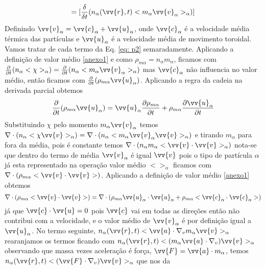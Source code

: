 \documentclass[12pt,oneside,a4paper]{abntex2}
\theoremstyle{definition}  %
\begin{document}
\begin{equation*}
=[\frac{\delta}{\delta t}(n_\alpha(\vv{r},t)<m_\alpha \vv{v}_\alpha>_\alpha)]
\end{equation*}
Definindo $\vv{v}_\alpha = \vv{c}_\alpha + \vv{u}_\alpha$, onde $\vv{c}_\alpha$ é a velocidade média térmica das partículas e  $\vv{u}_\alpha$ é a velocidade média de movimento toroidal. Vamos tratar de cada termo da Eq. \ref{eq: p2} semaradamente.
Aplicando a definição de valor médio \ref{anexo1} e como $ \rho_{m\alpha} = n_\alpha m_\alpha$, ficamos com $\frac{\partial }{\partial t} (n_\alpha <\chi>_\alpha)=\frac{\partial }{\partial t} (n_\alpha <m_\alpha \vv{v}_\alpha>_\alpha)$ mas $\vv{c}_\alpha$ não influencia no valor médio, então ficamos com $\frac{\partial }{\partial t} (\rho_{m\alpha} \vv{u}_\alpha)$. Aplicando a regra da cadeia na derivada parcial obtemos
\begin{equation}
\label{eq: pit14}
\frac{\partial }{\partial t} (\rho_{m\alpha} \vv{u}_\alpha) = \vv{u}_\alpha \frac{\partial \rho_{m\alpha}}{\partial t}+\rho_{m\alpha} \frac{\partial \vv{u}_\alpha}{\partial t}
\end{equation} 
Substituindo $\chi$ pelo momento $m_\alpha \vv{v}_\alpha$ temos $\nabla \cdot (n_\alpha <\chi \vv{v}>_\alpha) =  \nabla \cdot (n_\alpha <m_\alpha \vv{v}_\alpha \vv{v}>_\alpha)$ e tirando $m_\alpha$ para fora da média, pois é constante temos $\nabla \cdot (n_\alpha m_\alpha < \vv{v} \cdot \vv{v}>_\alpha)$ nota-se que dentro do termo de média $ \vv{v}_\alpha$ é igual $\vv{v}$ pois o tipo de partícula $\alpha$ já esta representado na operação valor médio $< >_\alpha$ ficamos com $\nabla \cdot (\rho_{m\alpha} <\vv{v} \cdot \vv{v}>)$.  Aplicando a definição de valor médio \ref{anexo1} obtemos 
\begin{equation}
\label{eq: pit15}
\nabla \cdot (\rho_{m\alpha} <\vv{v} \cdot \vv{v}>) = \nabla \cdot ( \rho_{m\alpha}\vv{u}_\alpha \cdot \vv{u}_\alpha + \rho_{m\alpha}<\vv{c}_\alpha \cdot \vv{c}_\alpha>)
\end{equation} 
já que $\vv{c} \cdot \vv{u} = 0$ pois $\vv{c}$ vai em todas as direções então não contribui com a velocidade, e o valor médio de $\vv{v}_\alpha$ é por definição igual a $\vv{u}_\alpha$.
No termo seguinte, $n_\alpha(\vv{r},t)<\vv{a} \cdot \nabla_v m_\alpha \vv{v}>_\alpha$ rearanjamos os termos ficando com $n_\alpha(\vv{r},t)<(m_\alpha \vv{a} \cdot \nabla_v) \vv{v}>_\alpha$ observando que massa vezes aceleração é força, $\vv{F} = \vv{a} \cdot m_\alpha $, temos $n_\alpha(\vv{r},t) <(\vv{F} \cdot \nabla_v)\vv{v}>_\alpha$ que nos da
\end{document}
